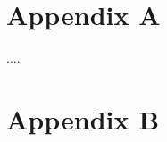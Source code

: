 %
%
\begin{appendix}
\label{chap:Appendix}
\chapter{Appendix A}
\setcounter{chapter}{1}
\label{A}
....


\chapter{Appendix B}
\label{B}

\pagebreak
\end{appendix}
